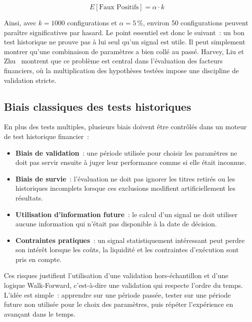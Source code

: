 \begin{equation}
E[\text{Faux Positifs}] = \alpha \cdot k
\label{eq:faux_positifs}
\end{equation}

Ainsi, avec $k = 1000$ configurations et $\alpha = 5\,\%$, environ 50 configurations
peuvent paraître significatives par hasard. Le point essentiel est donc le suivant~:
un bon test historique ne prouve pas à lui seul qu'un signal est utile. Il peut simplement
montrer qu'une combinaison de paramètres a bien collé au passé. Harvey, Liu et
Zhu~\cite{harvey2016} montrent que ce problème est central dans l'évaluation des
facteurs financiers, où la multiplication des hypothèses testées impose une discipline
de validation stricte.

\subsection{Biais classiques des tests historiques}

En plus des tests multiples, plusieurs biais doivent être contrôlés dans un moteur de
test historique financier~:

\begin{itemize}
    \item \textbf{Biais de validation}~: une période utilisée pour choisir les paramètres
    ne doit pas servir ensuite à juger leur performance comme si elle était inconnue.
    \item \textbf{Biais de survie}~: l'évaluation ne doit pas ignorer les titres retirés
    ou les historiques incomplets lorsque ces exclusions modifient artificiellement les
    résultats.
    \item \textbf{Utilisation d'information future}~: le calcul d'un signal ne doit
    utiliser aucune information qui n'était pas disponible à la date de décision.
    \item \textbf{Contraintes pratiques}~: un signal statistiquement intéressant peut
    perdre son intérêt lorsque les coûts, la liquidité et les contraintes d'exécution
    sont pris en compte.
\end{itemize}

Ces risques justifient l'utilisation d'une validation hors-échantillon et d'une logique
Walk-Forward, c'est-à-dire une validation qui respecte l'ordre du temps. L'idée est
simple~: apprendre sur une période passée, tester sur une période future non utilisée
pour le choix des paramètres, puis répéter l'expérience en avançant dans le temps.

